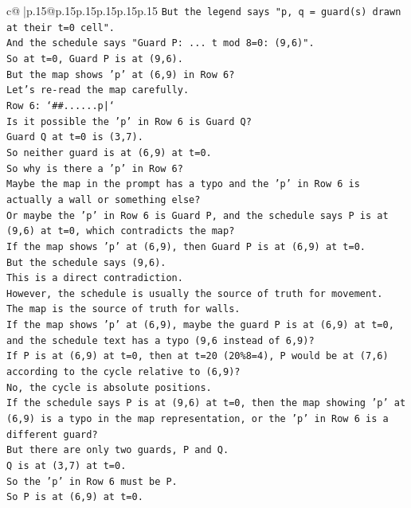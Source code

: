 \documentclass{article}
\begin{document}
{\begin{supertabular}{c@{$\;$}|p{.15\linewidth}@{}p{.15\linewidth}p{.15\linewidth}p{.15\linewidth}p{.15\linewidth}p{.15\linewidth}}
{{{\texttt{But the legend says "p, q = guard(s) drawn at their t=0 cell".} \\
\texttt{And the schedule says "Guard P: ... t mod 8=0: (9,6)".} \\
\texttt{So at t=0, Guard P is at (9,6).} \\
\texttt{But the map shows 'p' at (6,9) in Row 6?} \\
\texttt{Let's re{-}read the map carefully.} \\
\texttt{Row 6: `\#\#......p|`} \\
\texttt{Is it possible the 'p' in Row 6 is Guard Q?} \\
\texttt{Guard Q at t=0 is (3,7).} \\
\texttt{So neither guard is at (6,9) at t=0.} \\
\texttt{So why is there a 'p' in Row 6?} \\
\texttt{Maybe the map in the prompt has a typo and the 'p' in Row 6 is actually a wall or something else?} \\
\texttt{Or maybe the 'p' in Row 6 is Guard P, and the schedule says P is at (9,6) at t=0, which contradicts the map?} \\
\texttt{If the map shows 'p' at (6,9), then Guard P is at (6,9) at t=0.} \\
\texttt{But the schedule says (9,6).} \\
\texttt{This is a direct contradiction.} \\
\texttt{However, the schedule is usually the source of truth for movement.} \\
\texttt{The map is the source of truth for walls.} \\
\texttt{If the map shows 'p' at (6,9), maybe the guard P is at (6,9) at t=0, and the schedule text has a typo (9,6 instead of 6,9)?} \\
\texttt{If P is at (6,9) at t=0, then at t=20 (20\%8=4), P would be at (7,6) according to the cycle relative to (6,9)?} \\
\texttt{No, the cycle is absolute positions.} \\
\texttt{If the schedule says P is at (9,6) at t=0, then the map showing 'p' at (6,9) is a typo in the map representation, or the 'p' in Row 6 is a different guard?} \\
\texttt{But there are only two guards, P and Q.} \\
\texttt{Q is at (3,7) at t=0.} \\
\texttt{So the 'p' in Row 6 must be P.} \\
\texttt{So P is at (6,9) at t=0.} \\
}}}
\end{supertabular}}
\end{document}

